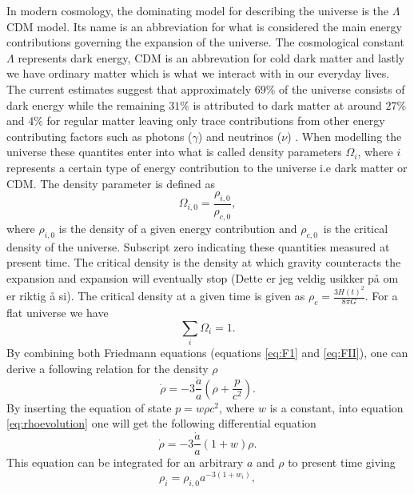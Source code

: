 In modern cosmology, the dominating model for describing the universe is the $\Lambda$CDM model. Its name is an abbreviation for what 
is considered the main energy contributions governing the expansion of the universe. The cosmological constant $\Lambda$ represents dark energy, CDM is an abbrevation for cold dark matter
and lastly we have ordinary matter which is what we interact with in our
everyday lives. The current estimates suggest that approximately $69\%$ of the
universe consists of dark energy while the remaining $31\%$ is attributed to
dark matter at around 
$27\%$ and $4\%$ for regular matter leaving only trace contributions from other
energy contributing factors such as photons ($\gamma$) and neutrinos ($\nu$)
\cite{planckparameters}. When modelling the universe these quantites
enter into 
what is called density parameters $\Omega_i$, where $i$ represents a certain type of energy contribution to the universe i.e dark matter or CDM. The density parameter is defined as
\begin{equation}\label{eq:densityparameter}
    \Omega_{i,0} = \frac{\rho_{i,0}}{\rho_{c,0}},
\end{equation}
where $\rho_{i,0}$ is the density of a given energy contribution and $\rho_{c,0}$ is
the critical density of the universe. Subscript zero indicating these quantities
measured at present time. The critical density is the density at
which gravity counteracts the expansion and expansion will eventually stop
(Dette er jeg veldig usikker på om er riktig å si). The critical density at a
given time is given as $\rho_c=\frac{3H(t)^2}{8\pi G}$. For a flat universe we have
\begin{equation}
    \sum_i \Omega_i = 1.
\end{equation}
By combining both Friedmann equations (equations \ref{eq:F1} and \ref{eq:FII}),
one can derive a following relation for the density $\rho$
\begin{equation}\label{eq:rhoevolution}
    \dot{\rho}=-3\frac{\dot{a}}{a}(\rho+\frac{p}{c^2}).
\end{equation}
By inserting the equation of state $p=w\rho c^2$, where $w$ is a constant,
into equation \ref{eq:rhoevolution} one will get the following differential
equation
\begin{equation}
    \dot{\rho}=-3\frac{\dot{a}}{a}(1+w)\rho.
\end{equation}
This equation can be integrated for an arbitrary $a$ and $\rho$ to present time
giving
\begin{equation}\label{eq:rho_i_evolution}
    \rho_i=\rho_{i,0}a^{-3(1+w_i)},
\end{equation}
